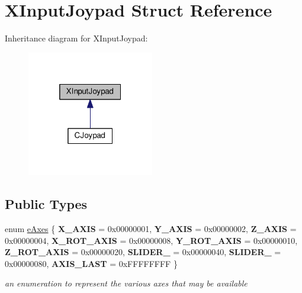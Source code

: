 \hypertarget{struct_x_input_joypad}{}\section{X\+Input\+Joypad Struct Reference}
\label{struct_x_input_joypad}


Inheritance diagram for X\+Input\+Joypad\+:\nopagebreak
\begin{figure}[H]
\begin{center}
\leavevmode
\includegraphics[width=157pt]{struct_x_input_joypad__inherit__graph}
\end{center}
\end{figure}
\subsection*{Public Types}
\begin{DoxyCompactItemize}
\item 
\mbox{\label{struct_x_input_joypad_a3adfafecc1c0d3c88e354d90cc8cf5eb}} 
enum \hyperlink{struct_x_input_joypad_a3adfafecc1c0d3c88e354d90cc8cf5eb}{e\+Axes} \{ \newline
{\bfseries X\+\_\+\+A\+X\+IS} = 0x00000001, 
{\bfseries Y\+\_\+\+A\+X\+IS} = 0x00000002, 
{\bfseries Z\+\_\+\+A\+X\+IS} = 0x00000004, 
{\bfseries X\+\_\+\+R\+O\+T\+\_\+\+A\+X\+IS} = 0x00000008, 
\newline
{\bfseries Y\+\_\+\+R\+O\+T\+\_\+\+A\+X\+IS} = 0x00000010, 
{\bfseries Z\+\_\+\+R\+O\+T\+\_\+\+A\+X\+IS} = 0x00000020, 
{\bfseries S\+L\+I\+D\+E\+R\+\_} = 0x00000040, 
{\bfseries S\+L\+I\+D\+E\+R\+\_} = 0x00000080, 
\newline
{\bfseries A\+X\+I\+S\+\_\+\+L\+A\+ST} = 0x\+F\+F\+F\+F\+F\+F\+FF
 \}\begin{DoxyCompactList}\small\item\em an enumeration to represent the various axes that may be available \end{DoxyCompactList}
\end{DoxyCompactItemize}
